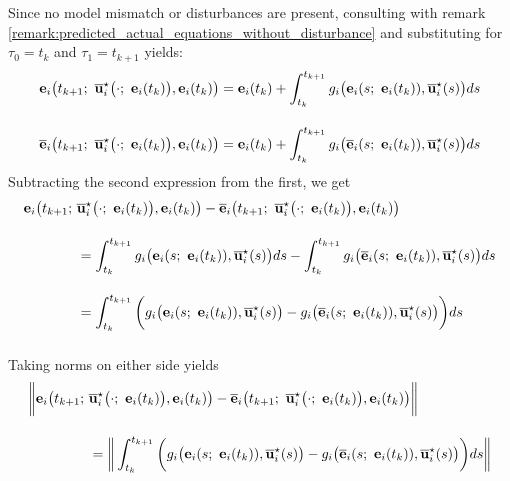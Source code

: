 \begin{gg_box}

Since no model mismatch or disturbances are present, consulting with remark
\eqref{remark:predicted_actual_equations_without_disturbance} and substituting
for $\tau_0 = t_k$ and $\tau_1 = t_{k+1}$ yields:
\begin{align}
  \vect{e}_i\big(t_{k+1};\ \overline{\vect{u}}_i^{\star}\big(\cdot;\ \vect{e}_i(t_k)\big), \vect{e}_i(t_k)\big) &=
    \vect{e}_i(t_k) + \int_{t_k}^{t_{k+1}} g_i\big(\vect{e}_i(s;\ \vect{e}_i(t_k)), \overline{\vect{u}}_i^{\star}(s)\big) ds \\[2.5ex]
  \overline{\vect{e}}_i\big(t_{k+1};\ \overline{\vect{u}}_i^{\star}\big(\cdot;\ \vect{e}_i(t_k)\big), \vect{e}_i(t_k)\big) &=
    \vect{e}_i(t_k) + \int_{t_k}^{t_{k+1}} g_i\big(\overline{\vect{e}}_i(s;\ \vect{e}_i(t_k)), \overline{\vect{u}}_i^{\star}(s)\big) ds
\end{align}
Subtracting the second expression from the first, we get
\begin{align}
  \vect{e}_i\big(t_{k+1};\ &\overline{\vect{u}}_i^{\star}\big(\cdot;\ \vect{e}_i(t_k)\big), \vect{e}_i(t_k)\big) -
  \overline{\vect{e}}_i\big(t_{k+1};\ \overline{\vect{u}}_i^{\star}\big(\cdot;\ \vect{e}_i(t_k)\big), \vect{e}_i(t_k)\big) \\[2.5ex]
  &=\int_{t_k}^{t_{k+1}} g_i\big(\vect{e}_i(s;\ \vect{e}_i(t_k)), \overline{\vect{u}}_i^{\star}(s)\big) ds -
    \int_{t_k}^{t_{k+1}} g_i\big(\overline{\vect{e}}_i(s;\ \vect{e}_i(t_k)), \overline{\vect{u}}_i^{\star}(s)\big) ds\\[2.5ex]
  &=\int_{t_k}^{t_{k+1}} \bigg( g_i\big(\vect{e}_i(s;\ \vect{e}_i(t_k)), \overline{\vect{u}}_i^{\star}(s)\big)
  - g_i\big(\overline{\vect{e}}_i(s;\ \vect{e}_i(t_k)), \overline{\vect{u}}_i^{\star}(s)\big) \bigg) ds \\[2.5ex]
\end{align}
Taking norms on either side yields
\begin{align}
  \bigg\|\vect{e}_i\big(t_{k+1};\ &\overline{\vect{u}}_i^{\star}\big(\cdot;\ \vect{e}_i(t_k)\big), \vect{e}_i(t_k)\big)
    -\overline{\vect{e}}_i\big(t_{k+1};\ \overline{\vect{u}}_i^{\star}\big(\cdot;\ \vect{e}_i(t_k)\big), \vect{e}_i(t_k)\big) \bigg\| \\[2.5ex]
  &=\bigg\|\int_{t_k}^{t_{k+1}} \bigg( g_i\big(\vect{e}_i(s;\ \vect{e}_i(t_k)), \overline{\vect{u}}_i^{\star}(s)\big)
  - g_i\big(\overline{\vect{e}}_i(s;\ \vect{e}_i(t_k)), \overline{\vect{u}}_i^{\star}(s)\big) \bigg) ds \bigg\|\\[2.5ex]

\end{align}
\end{gg_box}
